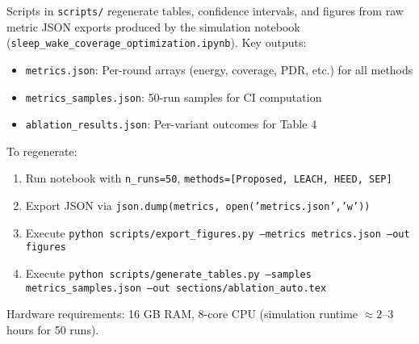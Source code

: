 Scripts in \texttt{scripts/} regenerate tables, confidence intervals, and figures from raw metric JSON exports produced by the simulation notebook (\texttt{sleep\_wake\_coverage\_optimization.ipynb}). Key outputs:
\begin{itemize}[noitemsep]
  \item \texttt{metrics.json}: Per-round arrays (energy, coverage, PDR, etc.) for all methods
  \item \texttt{metrics\_samples.json}: 50-run samples for CI computation
  \item \texttt{ablation\_results.json}: Per-variant outcomes for Table 4
\end{itemize}

To regenerate:
\begin{enumerate}[noitemsep]
  \item Run notebook with \texttt{n\_runs=50}, \texttt{methods=[Proposed, LEACH, HEED, SEP]}
  \item Export JSON via \texttt{json.dump(metrics, open('metrics.json','w'))}
  \item Execute \texttt{python scripts/export\_figures.py --metrics metrics.json --out figures}
  \item Execute \texttt{python scripts/generate\_tables.py --samples metrics\_samples.json --out sections/ablation\_auto.tex}
\end{enumerate}

Hardware requirements: 16 GB RAM, 8-core CPU (simulation runtime $\approx 2$--3 hours for 50 runs).
